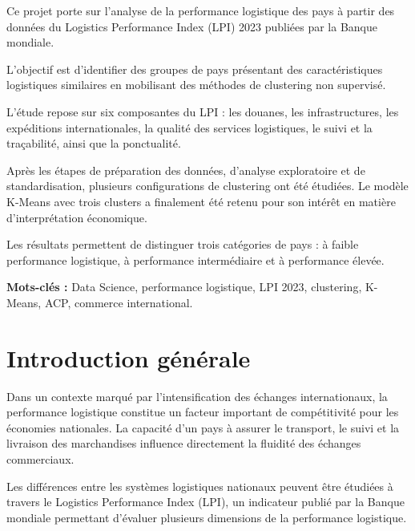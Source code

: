 \documentclass[11pt,a4paper]{article}
\begin{document}
Ce projet porte sur l'analyse de la performance logistique des pays
à partir des données du Logistics Performance Index (LPI) 2023
publiées par la Banque mondiale.

L'objectif est d'identifier des groupes de pays présentant des
caractéristiques logistiques similaires en mobilisant des méthodes
de clustering non supervisé.

L'étude repose sur six composantes du LPI : les douanes,
les infrastructures, les expéditions internationales, la qualité
des services logistiques, le suivi et la traçabilité, ainsi que
la ponctualité.

Après les étapes de préparation des données, d'analyse exploratoire
et de standardisation, plusieurs configurations de clustering ont
été étudiées. Le modèle K-Means avec trois clusters a finalement
été retenu pour son intérêt en matière d'interprétation économique.

Les résultats permettent de distinguer trois catégories de pays :
à faible performance logistique, à performance intermédiaire et
à performance élevée.

\vspace{0.5cm}

\noindent
\textbf{Mots-clés :} Data Science, performance logistique,
LPI 2023, clustering, K-Means, ACP, commerce international.

\newpage

\tableofcontents
\newpage

\listoffigures
\newpage



\section*{Introduction générale}

Dans un contexte marqué par l'intensification des échanges
internationaux, la performance logistique constitue un facteur
important de compétitivité pour les économies nationales.
La capacité d'un pays à assurer le transport, le suivi et la
livraison des marchandises influence directement la fluidité
des échanges commerciaux.

Les différences entre les systèmes logistiques nationaux peuvent
être étudiées à travers le Logistics Performance Index (LPI),
un indicateur publié par la Banque mondiale permettant d'évaluer
plusieurs dimensions de la performance logistique.
\end{document}
